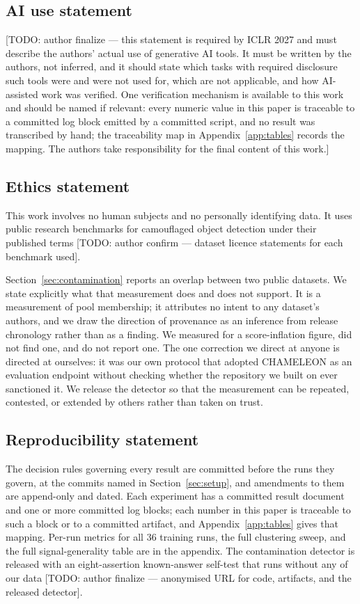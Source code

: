 \documentclass{article} %
\begin{document}
\subsection*{AI use statement}

[TODO: author finalize --- this statement is required by ICLR 2027 and must describe the authors'
actual use of generative AI tools. It must be written by the authors, not inferred, and it should
state which tasks with required disclosure such tools were and were not used for, which are not
applicable, and how AI-assisted work was verified. One verification mechanism is available to this
work and should be named if relevant: every numeric value in this paper is traceable to a committed
log block emitted by a committed script, and no result was transcribed by hand; the traceability map
in Appendix~\ref{app:tables} records the mapping. The authors take responsibility for the final
content of this work.]

\subsection*{Ethics statement}

This work involves no human subjects and no personally identifying data. It uses public research
benchmarks for camouflaged object detection under their published terms
[TODO: author confirm --- dataset licence statements for each benchmark used].

Section~\ref{sec:contamination} reports an overlap between two public datasets. We state explicitly
what that measurement does and does not support. It is a measurement of pool membership; it attributes
no intent to any dataset's authors, and we draw the direction of provenance as an inference from
release chronology rather than as a finding. We measured for a score-inflation figure, did not find
one, and do not report one. The one correction we direct at anyone is directed at ourselves: it was
our own protocol that adopted CHAMELEON as an evaluation endpoint without checking whether the
repository we built on ever sanctioned it. We release the detector so that the measurement can be
repeated, contested, or extended by others rather than taken on trust.

\subsection*{Reproducibility statement}

The decision rules governing every result are committed before the runs they govern, at the commits
named in Section~\ref{sec:setup}, and amendments to them are append-only and dated. Each experiment
has a committed result document and one or more committed log blocks; each number in this paper is
traceable to such a block or to a committed artifact, and Appendix~\ref{app:tables} gives that
mapping. Per-run metrics for all $36$ training runs, the full clustering sweep, and the full
signal-generality table are in the appendix. The contamination detector is released with an
eight-assertion known-answer self-test that runs without any of our data
[TODO: author finalize --- anonymised URL for code, artifacts, and the released detector].
\end{document}
